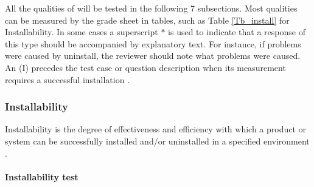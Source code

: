 \documentclass[12pt, titlepage]{article}
\begin{document}
All the qualities of \progname{} will be tested in the following 7
subsections. Most qualities can be measured by the grade sheet in tables, such
as Table \ref{Tb_install} for Installability. In some cases a superscript $*$ is
used to indicate that a response of this type should be accompanied by
explanatory text. For instance, if problems were caused by uninstall, the
reviewer should note what problems were caused. An (I) precedes the test case or
question description when its measurement requires a successful installation
\cite{SmithEtAl2018}.

\subsubsection{Installability}
\label{sec_installtest} Installability is the degree of effectiveness and
efficiency with which a product or system can be successfully installed and/or
uninstalled in a specified environment \cite{ISO/IEC25010:2011}.
	
\paragraph{Installability test}
\end{document}

